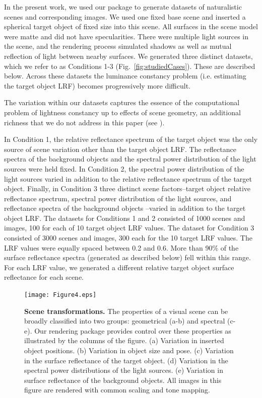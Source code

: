 \documentclass{jov}
\begin{document}
In the present work, we used our package to generate datasets of naturalistic scenes and corresponding images.
We used one fixed base scene and inserted a spherical target object of fixed size into this scene.
All surfaces in the scene model were matte and did not have specularities.
There were multiple light sources in the scene, and the rendering process simulated shadows as well as mutual reflection of light between nearby surfaces.
We generated three distinct datasets, which we refer to as Conditions 1-3 (Fig.~\ref{fig:studiedCases}). These are described below.
Across these datasets the luminance constancy problem (i.e. estimating the target object LRF)
becomes progressively more difficult.

The variation within our datasets captures the essence of the computational problem of lightness constancy
up to effects of scene geometry, an additional richness that we do not address in this paper (see ).

In Condition 1, the relative reflectance spectrum of the target object was the only source of scene variation other than the target object LRF.
The reflectance spectra of the background objects and the spectral power distribution of the light sources were held fixed.
In Condition 2, the spectral power distribution of the light sources varied in addition to the relative reflectance spectrum of the target object.
Finally, in Condition 3 three distinct scene factors--target object relative reflectance spectrum, spectral power distribution of the light sources, and reflectance spectra of the background objects
--varied in addition to the target object LRF.
The datasets for Conditions 1 and 2 consisted of 1000 scenes and images, 100 for each of 10 target object LRF values. 
The dataset for Condition 3 consisted of 3000 scenes and images, 300 each for the 10 target LRF values.
The LRF values were equally spaced between 0.2 and 0.6.
More than 90\% of the surface reflectance spectra (generated as described below) fell within this range.
For each LRF value, we generated a different relative target object surface reflectance for each scene. 

\begin{figure}
\texttt{[image: Figure4.eps]}
    \caption{{\bf Scene transformations.} The properties of a visual scene can be broadly classified into two groups: geometrical (a-b) and spectral (c-e). Our rendering package provides control over these properties as illustrated by the columns of the figure. (a) Variation in inserted object positions. (b) Variation in object size and pose. (c) Variation in the surface reflectance of the target object. (d) Variation in the spectral power distributions of the light sources. (e) Variation in surface reflectance of the background objects. All images in this figure are rendered with common scaling and tone mapping.
\label{fig:VWCCTransformations}}
\end{figure}
\end{document}
